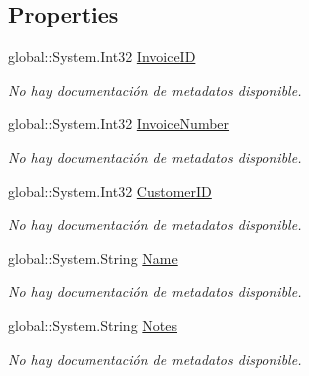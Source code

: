\subsection*{Properties}
\begin{DoxyCompactItemize}
\item 
global\-::\-System.\-Int32 \hyperlink{class_game_memory_1_1_invoices_a5e354613497aec5c10ef302d9d9e7258}{Invoice\-I\-D}
\begin{DoxyCompactList}\small\item\em No hay documentación de metadatos disponible. \end{DoxyCompactList}\item 
global\-::\-System.\-Int32 \hyperlink{class_game_memory_1_1_invoices_ae1338eba0dcd9ebfc1ae59ee289c9c15}{Invoice\-Number}
\begin{DoxyCompactList}\small\item\em No hay documentación de metadatos disponible. \end{DoxyCompactList}\item 
global\-::\-System.\-Int32 \hyperlink{class_game_memory_1_1_invoices_aae5190344c921ece5f25d62d34200c33}{Customer\-I\-D}
\begin{DoxyCompactList}\small\item\em No hay documentación de metadatos disponible. \end{DoxyCompactList}\item 
global\-::\-System.\-String \hyperlink{class_game_memory_1_1_invoices_a82fa8e4d468479126d9f05e6590bd95f}{Name}
\begin{DoxyCompactList}\small\item\em No hay documentación de metadatos disponible. \end{DoxyCompactList}\item 
global\-::\-System.\-String \hyperlink{class_game_memory_1_1_invoices_a5e477e04fbcd9ad7185e8262af528be3}{Notes}
\begin{DoxyCompactList}\small\item\em No hay documentación de metadatos disponible. \end{DoxyCompactList}\item 

\end{DoxyCompactItemize}
